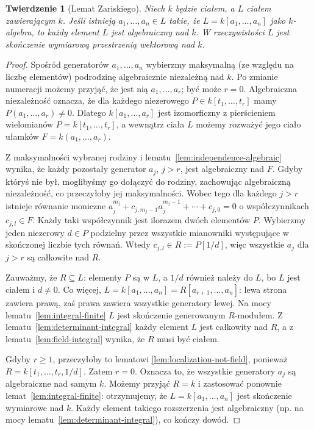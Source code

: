 \documentclass[11pt,a4paper,openany]{report}
\numberwithin{equation}{section}
\theoremstyle{plain}
\newtheorem{twierdzenie}{Twierdzenie}[section]
\theoremstyle{definition}
\theoremstyle{remark}
\begin{document}
\begin{twierdzenie}[Lemat Zariskiego]
\label{tw:zariski-lemma}
Niech $k$ będzie ciałem, a $L$ ciałem zawierającym $k$.
Jeśli istnieją $a_1,\dots,a_n\in L$ takie, że
$L=k[a_1,\dots,a_n]$ jako $k$-algebra, to każdy element $L$
jest algebraiczny nad $k$. W rzeczywistości $L$ jest
skończenie wymiarową przestrzenią wektorową nad $k$.
\end{twierdzenie}
\begin{proof}
Spośród generatorów $a_1,\dots,a_n$ wybierzmy maksymalną
(ze względu na liczbę elementów) podrodzinę algebraicznie
niezależną nad $k$. Po zmianie numeracji możemy przyjąć,
że jest nią $a_1,\dots,a_r$; być może $r=0$.
Algebraiczna niezależność oznacza, że dla każdego
niezerowego $P\in k[t_1,\dots,t_r]$ mamy
$P(a_1,\dots,a_r)\ne0$.
Dlatego $k[a_1,\dots,a_r]$ jest izomorficzny z
pierścieniem wielomianów $P=k[t_1,\dots,t_r]$,
a wewnątrz ciała $L$ możemy rozważyć jego ciało ułamków
$F=k(a_1,\dots,a_r)$.

Z maksymalności wybranej rodziny i
lematu~\ref{lem:independence-algebraic} wynika, że każdy
pozostały generator $a_j$, $j>r$, jest algebraiczny nad $F$.
Gdyby któryś nie był, moglibyśmy go dołączyć do rodziny,
zachowując algebraiczną niezależność, co przeczyłoby jej
maksymalności. Wobec tego dla każdego $j>r$ istnieje
równanie moniczne
$ a_j^{m_j}+c_{j,m_j-1}a_j^{m_j-1}+\cdots+c_{j,0}=0$
o współczynnikach $c_{j,l}\in F$.
Każdy taki współczynnik jest ilorazem dwóch elementów $P$.
Wybierzmy jeden niezerowy $d\in P$ podzielny przez wszystkie
mianowniki występujące w skończonej liczbie tych równań.
Wtedy $c_{j,l}\in R:=P[1/d]$, więc wszystkie $a_j$ dla $j>r$
są całkowite nad $R$.

Zauważmy, że $R\subseteq L$: elementy $P$ są w $L$,
a $1/d$ również należy do $L$, bo $L$ jest ciałem i $d\ne0$.
Co więcej,
$L=k[a_1,\dots,a_n]=R[a_{r+1},\dots,a_n]$:
lewa strona zawiera prawą, zaś prawa zawiera wszystkie generatory
lewej. Na mocy lematu~\ref{lem:integral-finite}
$L$ jest skończenie generowanym $R$-modułem.
Z lematu~\ref{lem:determinant-integral} każdy element $L$
jest całkowity nad $R$, a z lematu~\ref{lem:field-integral}
wynika, że $R$ musi być ciałem.

Gdyby $r\ge1$, przeczyłoby to lematowi
\ref{lem:localization-not-field}, ponieważ
$R=k[t_1,\dots,t_r,1/d]$. Zatem $r=0$.
Oznacza to, że wszystkie generatory $a_j$ są algebraiczne nad
samym $k$. Możemy przyjąć $R=k$ i zastosować ponownie
lemat~\ref{lem:integral-finite}: otrzymujemy, że
$L=k[a_1,\dots,a_n]$ jest skończenie wymiarowe nad $k$.
Każdy element takiego rozszerzenia jest algebraiczny
(np. na mocy lematu~\ref{lem:determinant-integral}), co kończy dowód.
\end{proof}
\end{document}
